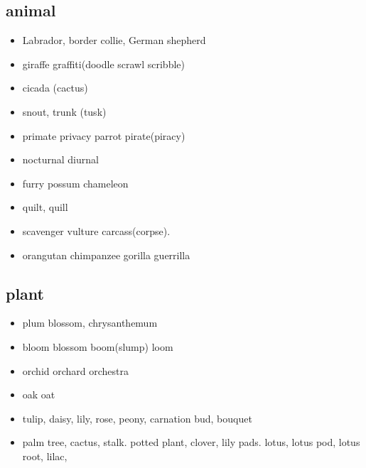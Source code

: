 \documentclass[a4paper,11pt,twoside]{book}
\begin{document}
\subsection{animal}
\begin{itemize}
	
	\item Labrador, border collie, German shepherd
	\item giraffe graffiti(doodle scrawl scribble) 
	
	\item cicada (cactus)
	
	\item snout, trunk (tusk)
	
	\item primate privacy parrot pirate(piracy)
		
	\item nocturnal diurnal
		
	\item furry possum chameleon 
	
	\item quilt, quill
	
	\item scavenger vulture carcass(corpse).
	
	\item orangutan chimpanzee gorilla guerrilla 
\end{itemize}

\subsection{plant}
\begin{itemize}
	\item plum blossom, chrysanthemum
	
	\item bloom blossom boom(slump) loom
	
	\item orchid orchard orchestra
	
	\item oak oat
	
	\item tulip, daisy, lily, rose, peony, carnation bud, bouquet 
	
	\item palm tree, cactus, stalk. potted plant, clover, lily pads. lotus, lotus pod, lotus root, lilac,
	
	
\end{itemize}
\end{document}
